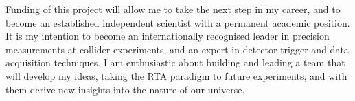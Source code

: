 Funding of this project will allow me to take the next step in my career, and to become an established independent scientist with a permanent academic position.
It is my intention to become an internationally recognised leader in precision measurements at collider experiments, and an expert in detector trigger and data acquisition techniques. I am enthusiastic about building and leading a team that will develop my ideas, taking the RTA paradigm to future experiments, and with them derive new insights into the nature of our universe. 
 